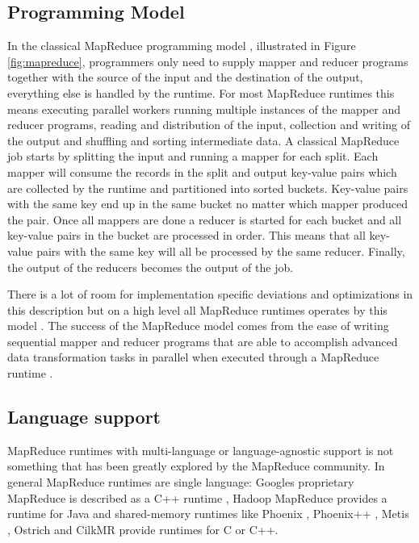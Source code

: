 \documentclass[twocolumn,11px]{article}       %
\begin{document}
\subsection{Programming Model}

In the classical MapReduce programming model \cite{GoogleMapReduce}, illustrated
in Figure \ref{fig:mapreduce}, programmers only need to supply mapper and
reducer programs together with the source of the input and the destination of
the output, everything else is handled by the runtime. For most MapReduce
runtimes this means executing parallel workers running multiple instances of the
mapper and reducer programs, reading and distribution of the input, collection
and writing of the output and shuffling and sorting intermediate data. A
classical MapReduce job starts by splitting the input and running a mapper for
each split. Each mapper will consume the records in the split and output
key-value pairs which are collected by the runtime and partitioned into sorted
buckets. Key-value pairs with the same key end up in the same bucket no matter
which mapper produced the pair. Once all mappers are done a reducer is started
for each bucket and all key-value pairs in the bucket are processed in order.
This means that all key-value pairs with the same key will all be processed by
the same reducer. Finally, the output of the reducers becomes the output of the
job.

There is a lot of room for implementation specific deviations and optimizations
in this description but on a high level all MapReduce runtimes operates by this
model \cite{GoogleMapReduce} \cite{Hadoop} \cite{Phoenix} \cite{Phoenix++}
\cite{CilkMR} \cite{Metis} \cite{Ostrich}. The success of the MapReduce model
comes from the ease of writing sequential mapper and reducer programs that are
able to accomplish advanced data transformation tasks in parallel when executed
through a MapReduce runtime \cite{GoogleMapReduce}.

\subsection{Language support}

MapReduce runtimes with multi-language or language-agnostic support is not
something that has been greatly explored by the MapReduce community. In general
MapReduce runtimes are single language: Googles proprietary MapReduce is
described as a C++ runtime \cite{GoogleMapReduce}, Hadoop MapReduce provides a
runtime for Java \cite{Hadoop} and shared-memory runtimes like Phoenix
\cite{Phoenix}, Phoenix++ \cite{Phoenix++}, Metis \cite{Metis}, Ostrich
\cite{Ostrich} and CilkMR \cite{CilkMR} provide runtimes for C or C++.
\end{document}
